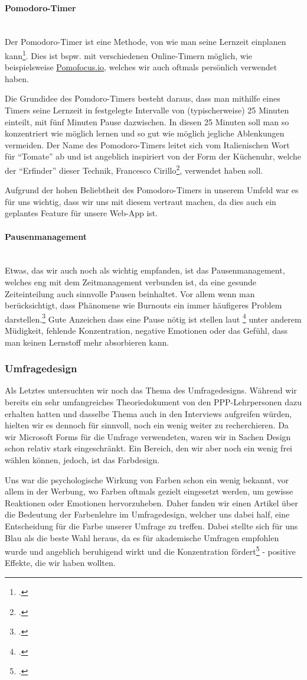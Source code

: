 \documentclass[12pt,a4paper]{report}
\newcommand{\myparagraph}[1]{\paragraph{#1}\mbox{}\\}
\begin{document}
\myparagraph{Pomodoro-Timer}
Der Pomodoro-Timer ist eine Methode, von wie man seine Lernzeit einplanen kann\footcite{Pomodoro}.
Dies ist bspw. mit verschiedenen Online-Timern möglich, wie beispielsweise \href{https://pomofocus.io/}{Pomofocus.io}, welches wir auch oftmals persönlich verwendet haben.

Die Grundidee des Pomdoro-Timers besteht daraus, dass man mithilfe eines Timers seine Lernzeit in festgelegte Intervalle von (typischerweise) 25 Minuten einteilt, mit fünf Minuten Pause dazwischen.
In diesen 25 Minuten soll man so konzentriert wie möglich lernen und so gut wie möglich jegliche Ablenkungen vermeiden. Der Name des Pomodoro-Timers leitet sich vom Italienischen Wort für \enquote{Tomate} ab und ist angeblich inspiriert von der Form der Küchenuhr, welche der \enquote{Erfinder} dieser Technik, Francesco Cirillo\footcite{Pomodoro}, verwendet haben soll.

Aufgrund der hohen Beliebtheit des Pomodoro-Timers in unserem Umfeld war es für uns wichtig, dass wir uns mit diesem vertraut machen, da dies auch ein geplantes Feature für unsere Web-App ist.

\myparagraph{Pausenmanagement}
Etwas, das wir auch noch als wichtig empfanden, ist das Pausenmanagement, welches eng mit dem Zeitmanagement verbunden ist, da eine gesunde Zeiteinteilung auch sinnvolle Pausen beinhaltet.
Vor allem wenn man berücksichtigt, dass Phänomene wie Burnouts ein immer häufigeres Problem darstellen.\footcite{Burnout}
Gute Anzeichen dass eine Pause nötig ist stellen laut \footcite{Pausenmanagement} unter anderem Müdigkeit, fehlende Konzentration, negative Emotionen oder das Gefühl, dass man keinen Lernstoff mehr absorbieren kann.

\subsubsection{Umfragedesign}
Als Letztes untersuchten wir noch das Thema des Umfragedesigns. 
Während wir bereits ein sehr umfangreiches Theoriedokument von den PPP-Lehrpersonen dazu erhalten hatten und dasselbe Thema auch in den Interviews aufgreifen würden, hielten wir es dennoch für sinnvoll, noch ein wenig weiter zu recherchieren.
Da wir Microsoft Forms für die Umfrage verwendeten, waren wir in Sachen Design schon relativ stark eingeschränkt. 
Ein Bereich, den wir aber noch ein wenig frei wählen können, jedoch, ist das Farbdesign.

Uns war die psychologische Wirkung von Farben schon ein wenig bekannt, vor allem in der Werbung, wo Farben oftmals gezielt eingesetzt werden, um gewisse Reaktionen oder Emotionen hervorzuheben.
Daher fanden wir einen Artikel über die Bedeutung der Farbenlehre im Umfragedesign, welcher uns dabei half, eine Entscheidung für die Farbe unserer Umfrage zu treffen.
Dabei stellte sich für uns Blau als die beste Wahl heraus, da es für akademische Umfragen empfohlen wurde und angeblich beruhigend wirkt und die Konzentration fördert\footcite{ColorPsychology} - positive Effekte, die wir haben wollten. 
\end{document}
